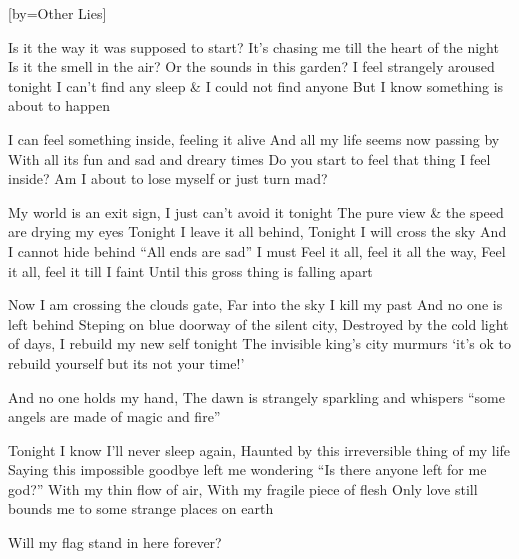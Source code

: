 [by={Other Lies}]

  \chordsoff

  \beginverse

  Is it the way it was supposed to start?
  It’s chasing me till the heart of the night 
  Is it the smell in the air?
  Or the sounds in this garden?
  I feel strangely aroused tonight
  I can’t find any sleep
  \& I could not find anyone
  But I know something is about to happen
  \endverse

  \beginchorus

  I can feel something inside, feeling it alive
  And all my life seems now passing by
  With all its fun and sad and dreary times 
  Do you start to feel that thing I feel inside?
  Am I about to lose myself or just turn mad?
  \endchorus

  \beginverse  

  My world is an exit sign,
  I just can’t avoid it tonight  
  The pure view \& the speed are drying my eyes 
  Tonight I leave it all behind,
  Tonight I will cross the sky 
  And I cannot hide behind “All ends are sad”
  I  must Feel it all, feel it all the way,
  Feel it all, feel it till I faint
  Until this gross thing is falling apart
  \endverse

  \beginchorus

  Now I am crossing the clouds gate,
  Far into the sky I kill my past
  And no one is left behind
  Steping on blue doorway of the silent city,
  Destroyed by the cold light of days,
  I rebuild my new self tonight
  The invisible king’s city murmurs
  ‘it’s ok to rebuild yourself but its not your time!’
  \endchorus


  \beginverse  
  And no one holds my hand,
  The dawn is strangely sparkling and whispers
  “some angels are made of magic and fire”
  \endverse

  \beginverse
  
  Tonight I know I’ll never sleep again,
  Haunted by this irreversible thing of my life
  Saying this impossible goodbye left me wondering
  “Is there anyone left for me god?”
  With my thin flow of air,
  With my fragile piece of flesh 
  Only love still bounds me to some strange places on earth
  
  Will my flag stand in here forever?
  \endverse


  
\endsong
